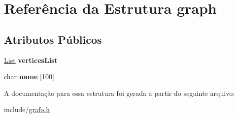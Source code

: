\hypertarget{structgraph}{}\section{Referência da Estrutura graph}
\label{structgraph}
\subsection*{Atributos Públicos}
\begin{DoxyCompactItemize}
\item 
\mbox{\label{structgraph_a0ead4ec9235a10bc2f6cd453e508eac6}} 
\hyperlink{structlistNode}{List} {\bfseries vertices\+List}
\item 
\mbox{\label{structgraph_a1889833150d9fb8ca2618ad45b6bda43}} 
char {\bfseries name} \mbox{[}100\mbox{]}
\end{DoxyCompactItemize}


A documentação para essa estrutura foi gerada a partir do seguinte arquivo\+:\begin{DoxyCompactItemize}
\item 
include/\hyperlink{grafo_8h}{grafo.\+h}\end{DoxyCompactItemize}
